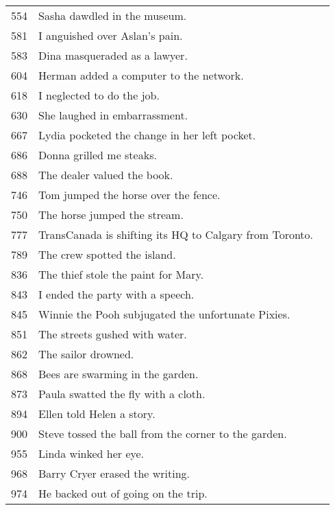 \begin{longtable}{llr}
554	&	Sasha dawdled in the museum.	\\
581	&	I anguished over Aslan's pain.	\\
583	&	Dina masqueraded as a lawyer.	\\
604	&	Herman added a computer to the network.	\\
618	&	I neglected to do the job.	\\
630	&	She laughed in embarrassment.	\\
667	&	Lydia pocketed the change in her left pocket.	\\
686	&	Donna grilled me steaks.	\\
688	&	The dealer valued the book.	\\
746	&	Tom jumped the horse over the fence.	\\
750	&	The horse jumped the stream.	\\
777	&	TransCanada is shifting its HQ to Calgary from Toronto.	\\
789	&	The crew spotted the island.	\\
836	&	The thief stole the paint for Mary.	\\
843	&	I ended the party with a speech.	\\
845	&	Winnie the Pooh subjugated the unfortunate Pixies.	\\
851	&	The streets gushed with water.	\\
862	&	The sailor drowned.	\\
868	&	Bees are swarming in the garden.	\\
873	&	Paula swatted the fly with a cloth.	\\
894	&	Ellen told Helen a story.	\\
900	&	Steve tossed the ball from the corner to the garden.	\\
955	&	Linda winked her eye.	\\
968	&	Barry Cryer erased the writing.	\\
974	&	He backed out of going on the trip.	\\
 \midrule
\end{longtable}

